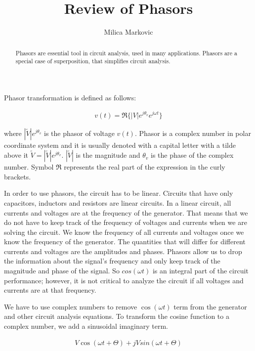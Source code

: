 \documentclass{ximera}
\title{Review of Phasors}
\author{Milica Markovic}
\begin{document}
  
\begin{abstract}  
Phasors are essential tool in circuit analysis, used in many applications. Phasors are a special case of superposition, that simplifies circuit analysis. 
\end{abstract}  
\maketitle    


\begin{definition}
Phasor transformation is defined as follows:

\begin{eqnarray}
v(t)=\Re\{|V|e^{j\theta_v} e^{j \omega t}\}
\end{eqnarray}

where $|\widetilde{V}|e^{j\theta_v}$ is the phasor of voltage $v(t)$. Phasor is a complex number in polar coordinate system and it is usually denoted with a capital letter with a tilde above it $\widetilde{V} = |\widetilde{V}|e^{j\theta_v}$. $ |\widetilde{V}|$ is the magnitude and $\theta_v$ is the phase of the complex number. Symbol $\Re$ represents the real part of the expression in the curly brackets. 

\end{definition}



In order to use phasors, the circuit has to be linear. Circuits that have  only capacitors, inductors and resistors are 
linear circuits.  In a  linear circuit, all currents and voltages are at the frequency of the generator. That means that we do not have to keep track of the frequency of voltages and currents when we are solving the circuit. We know the frequency of all currents and voltages once we know the frequency of the generator. The quantities that will differ for different currents and voltages are the amplitudes and phases. Phasors allow us to drop the information about the signal's frequency and only keep track of the magnitude and phase of the signal. So $cos (\omega t)$ is an integral part of the circuit performance; however, it is not critical to analyze the circuit if all voltages and currents are at that frequency.


 We have to use complex numbers to remove $ \cos (\omega t)$  term from the generator and other circuit analysis equations.  To transform the cosine function to a complex number, we add a sinusoidal imaginary term.

\begin{eqnarray}
 V \cos (\omega t + \Theta ) + j V sin (\omega t + \Theta) 
\end{eqnarray}
\end{document}
